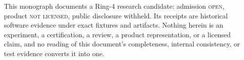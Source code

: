 \begin{boundary}\label{evid:bd:final}
This monograph documents a Ring-4 research candidate: admission \textsc{open}, product \textsc{not licensed}, public disclosure withheld. Its receipts are historical software evidence under exact fixtures and artifacts. Nothing herein is an experiment, a certification, a review, a product representation, or a licensed claim, and no reading of this document's completeness, internal consistency, or test evidence converts it into one.
\end{boundary}
